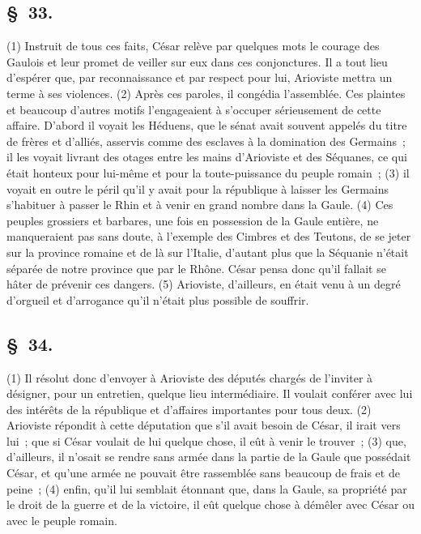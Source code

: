 \documentclass[french,twoside]{book} %
\begin{document}
\subsection[{§ 33.}]{ \textsc{§ 33.} }
\noindent (1) Instruit de tous ces faits, César relève par quelques mots le courage des Gaulois et leur promet de veiller sur eux dans ces conjonctures. Il a tout lieu d’espérer que, par reconnaissance et par respect pour lui, Arioviste mettra un terme à ses violences. (2) Après ces paroles, il congédia l’assemblée. Ces plaintes et beaucoup d’autres motifs l’engageaient à s’occuper sérieusement de cette affaire. D'abord il voyait les Héduens, que le sénat avait souvent appelés du titre de frères et d’alliés, asservis comme des esclaves à la domination des Germains ; il les voyait livrant des otages entre les mains d’Arioviste et des Séquanes, ce qui était honteux pour lui-même et pour la toute-puissance du peuple romain ; (3) il voyait en outre le péril qu’il y avait pour la république à laisser les Germains s’habituer à passer le Rhin et à venir en grand nombre dans la Gaule. (4) Ces peuples grossiers et barbares, une fois en possession de la Gaule entière, ne manqueraient pas sans doute, à l’exemple des Cimbres et des Teutons, de se jeter sur la province romaine et de là sur l’Italie, d’autant plus que la Séquanie n’était séparée de notre province que par le Rhône. César pensa donc qu’il fallait se hâter de prévenir ces dangers. (5) Arioviste, d’ailleurs, en était venu à un degré d’orgueil et d’arrogance qu’il n’était plus possible de souffrir.
\subsection[{§ 34.}]{ \textsc{§ 34.} }
\noindent (1) Il résolut donc d’envoyer à Arioviste des députés chargés de l’inviter à désigner, pour un entretien, quelque lieu intermédiaire. Il voulait conférer avec lui des intérêts de la république et d’affaires importantes pour tous deux. (2) Arioviste répondit à cette députation que s’il avait besoin de César, il irait vers lui ; que si César voulait de lui quelque chose, il eût à venir le trouver ; (3) que, d’ailleurs, il n’osait se rendre sans armée dans la partie de la Gaule que possédait César, et qu’une armée ne pouvait être rassemblée sans beaucoup de frais et de peine ; (4) enfin, qu’il lui semblait étonnant que, dans la Gaule, sa propriété par le droit de la guerre et de la victoire, il eût quelque chose à démêler avec César ou avec le peuple romain.
\end{document}
